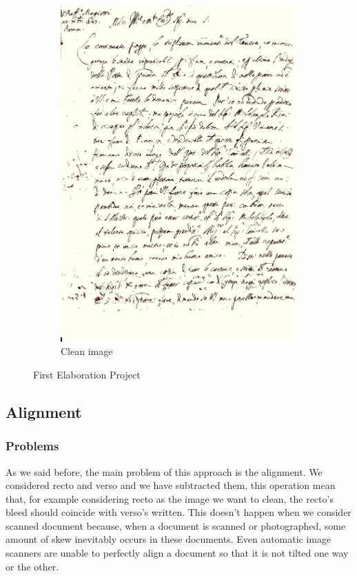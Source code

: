 \documentclass[%
 reprint,
 amsmath,amssymb,
 aps,
]{revtex4-1}
\begin{document}
\begin{figure}
\begin{subfigure}{.9\columnwidth}
\includegraphics[width=\columnwidth]{gali2Pulito}%
\caption{Clean image}%
\label{subfigb}%
\end{subfigure}\hfill%
\caption{First Elaboration Project}
\label{figabc}
\end{figure}

\subsection{\label{sec:level3}Alignment}
\subsubsection{Problems}
As we said before, the main problem of this approach is the alignment. We considered recto and verso and we have subtracted them, this operation mean that, for example considering recto as the image we want to clean, the recto's bleed should coincide with verso's written. 
This doesn't happen when we consider scanned document because, when a document is scanned or photographed, some amount of skew inevitably occurs in these documents.
 Even automatic image scanners are unable to perfectly align a document so that it is not tilted one way or the other.
\end{document}
